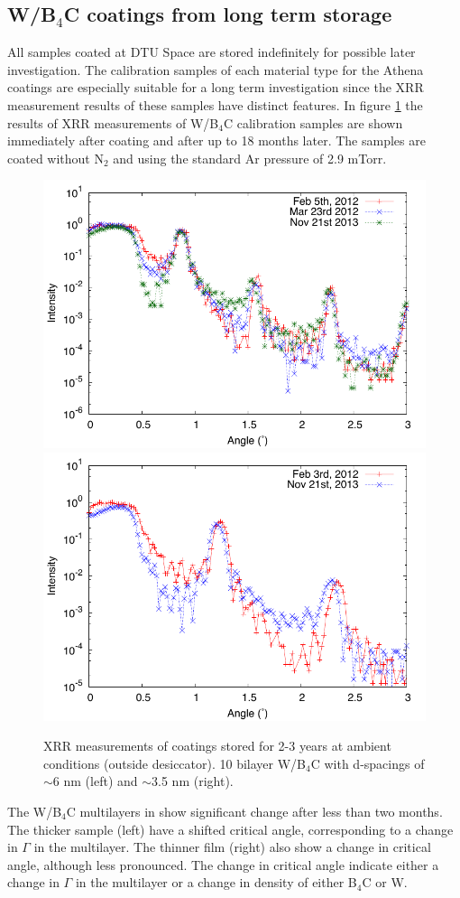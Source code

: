 \subsection{W/B$_4$C coatings from long term storage}\label{sec:longterm_wb4c}
All samples coated at DTU Space are stored indefinitely for possible later investigation. The calibration samples of each material type for the Athena coatings are especially suitable for a long term investigation since the XRR measurement results of these samples have distinct features. In figure \ref{fig:longterm_wb4c} the results of XRR measurements of W/B$_4$C calibration samples are shown immediately after coating and after up to 18 months later. The samples are coated without N$_2$ and using the standard Ar pressure of 2.9 mTorr.

\begin{figure}[htbp]
  \center   \includegraphics[width=0.47\linewidth]{figures/athena/coatings/w-b4c-kalib2.pdf}  \includegraphics[width=0.47\linewidth]{figures/athena/coatings/w-b4c-kalib1.pdf}
\caption{\footnotesize XRR measurements of coatings stored for 2-3 years at ambient conditions (outside desiccator). 10 bilayer W/B$_4$C with d-spacings of $\sim$6 nm (left) and $\sim$3.5 nm (right). }\label{fig:longterm_wb4c}
\end{figure}

The W/B$_4$C multilayers in  show significant change after less than two months. The thicker sample (left) have a shifted critical angle, corresponding to a change in $\Gamma$ in the multilayer. The thinner film (right) also show a change in critical angle, although less pronounced. The change in critical angle indicate either a change in $\Gamma$ in the multilayer or a change in density of either B$_4$C or W.

